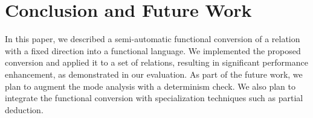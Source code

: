 \section{Conclusion and Future Work}

In this paper, we described a semi-automatic functional conversion of a \micro relation with a fixed direction into a functional language.
We implemented the proposed conversion and applied it to a set of relations, resulting in significant performance enhancement, as demonstrated in our evaluation.  
As part of the future work, we plan to augment the mode analysis with a determinism check.
We also plan to integrate the functional conversion with specialization techniques such as partial deduction.
